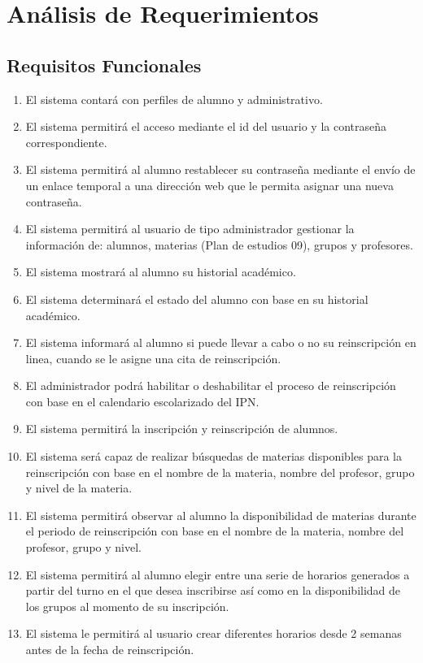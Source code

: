 \chapter{Análisis de Requerimientos}
\section{Requisitos Funcionales}
\begin{enumerate}[{RF} 1.]
\item El sistema contará con perfiles de alumno y administrativo.
\item El sistema permitirá el acceso mediante el id del usuario y la contraseña correspondiente.
\item El sistema permitirá al alumno restablecer su contraseña mediante el envío de un enlace temporal a una dirección web que le permita asignar una nueva contraseña. 
\item El sistema permitirá al usuario de tipo administrador gestionar la información de: alumnos, materias (Plan de estudios 09), grupos y profesores.
\item El sistema mostrará al alumno su historial académico.
\item El sistema determinará el estado del alumno con base en su historial académico.
\item El sistema informará al alumno si puede llevar a cabo o no su reinscripción en linea, cuando se le asigne una cita de reinscripción.
\item El administrador podrá habilitar o deshabilitar el proceso de reinscripción con base en el calendario escolarizado del IPN.
\item El sistema permitirá la inscripción y reinscripción de alumnos.
\item El sistema será capaz de realizar búsquedas de materias disponibles para la reinscripción con base en el nombre de la materia, nombre del profesor, grupo y nivel de la materia.
\item El sistema permitirá observar al alumno la disponibilidad de materias durante el periodo de reinscripción con base en el nombre de la materia, nombre del profesor, grupo y nivel.
\item El sistema permitirá al alumno elegir entre una serie de horarios generados a partir del turno en el que desea inscribirse así como en la disponibilidad de los grupos al momento de su inscripción.
\item El sistema le permitirá al usuario crear diferentes horarios desde 2 semanas antes de la fecha de reinscripción.

\end{enumerate}
